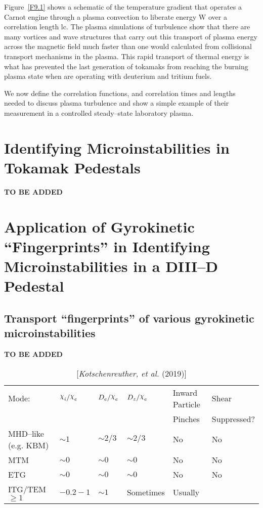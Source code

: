 \documentclass[a4paper,openany,12pt]{book}
\def\chix{\raise.5ex\hbox{$\chi$}}
\begin{document}
Figure~\ref{F9.1} shows a schematic of the temperature gradient that operates a Carnot engine through a plasma convection to liberate energy $\mathrm{W}$ over a correlation length lc. The plasma simulations of turbulence show that there are many vortices and wave structures that carry out this transport of plasma energy across the magnetic field much faster than one would calculated from collisional transport mechanisms in the plasma. This rapid transport of thermal energy is what has prevented the last generation of tokamaks from reaching the burning plasma state when are operating with deuterium and tritium fuels. 

We now define the correlation functions, and correlation times and lengths needed to discuss plasma turbulence and show a simple example of their measurement in a controlled steady--state laboratory plasma.
%
\section{Identifying Microinstabilities in Tokamak Pedestals}

\textbf{TO BE ADDED}

\section[Application of Gyrokinetic ``Fingerprints'']{Application of Gyrokinetic ``Fingerprints'' in Identifying Microinstabilities in a DIII--D Pedestal}

\subsection{Transport ``fingerprints'' of various gyrokinetic microinstabilities}

\textbf{TO BE ADDED}
%
\begin{table}[H]
\begin{center}
\caption{[\emph{Kotschenreuther, et al.} (2019)]}
\begin{tabular}{llllll}\\\hline\hline
Mode:  &$\chix_i/\chix_e$  &$D_e/\chix_e$   &$D_z/\chix_e$ &Inward Particle  &Shear\\
&&&& Pinches  &Suppressed?\\ \hline\hline
MHD--like (e.g. KBM)  &$\sim 1$  &$\sim 2/3$  &$\sim 2/3$  &No  &No\\
MTM  &$\sim 0$  &$\sim 0$  &$\sim 0$  &No  &No\\
ETG  &$\sim 0$ &$\sim 0$   &$\sim 0$  &No    &No\\
ITG/TEM  $\ge 1$   &$-0.2-1$   &$\sim 1$  &Sometimes  &Usually &\\ \hline\hline
\end{tabular}
\label{T9.1}
\end{center}
\end{table}
%
\end{document}
